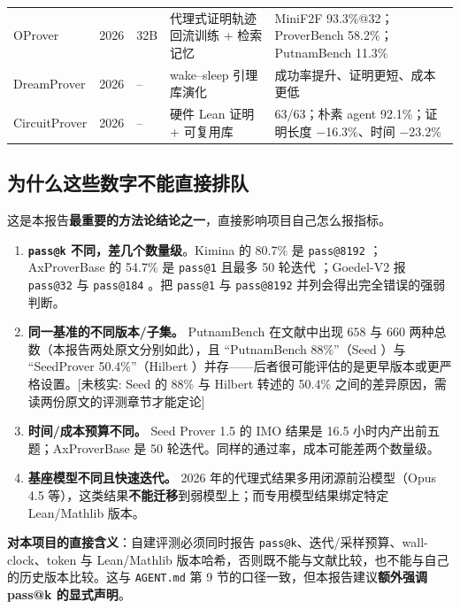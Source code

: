 \documentclass[UTF8,a4paper,11pt,fontset=windows]{ctexart}
\newcommand{\code}[1]{\texttt{#1}}
\newcommand{\unverified}[1]{\textcolor{warnred}{[未核实: #1]}}
\newcommand{\brk}{\penalty0\relax}
\begin{document}
{\begin{longtable}{@{}L{2.6cm}L{0.9cm}L{2.4cm}L{4.0cm}L{5.3cm}@{}}
OProver & 2026 & 32B & 代理式证明轨迹回流训练 + 检索记忆 & MiniF2F 93.3\%@32；\brk{}ProverBench 58.2\%；\brk{}PutnamBench 11.3\% \cite{oprover} \\
DreamProver & 2026 & -- & wake--sleep 引理库演化 & 成功率提升、证明更短、成本更低 \cite{dreamprover} \\
CircuitProver & 2026 & -- & 硬件 Lean 证明 + 可复用库 & 63/63；朴素 agent 92.1\%；证明长度 $-$16.3\%、时间 $-$23.2\% \cite{circuitprover} \\
\end{longtable}
}

\subsection{为什么这些数字不能直接排队}\label{sec:incomparable}

这是本报告\textbf{最重要的方法论结论之一}，直接影响项目自己怎么报指标。

\begin{enumerate}
  \item \textbf{\code{pass@k} 不同，差几个数量级}。Kimina 的 80.7\% 是 \code{pass@8192} \cite{kimina}；AxProverBase 的 54.7\% 是 \code{pass@1} 且最多 50 轮迭代 \cite{axprover}；Goedel-V2 报 \code{pass@32} 与 \code{pass@184} \cite{goedelv2}。把 \code{pass@1} 与 \code{pass@8192} 并列会得出完全错误的强弱判断。
  \item \textbf{同一基准的不同版本/子集。} PutnamBench 在文献中出现 $658$ 与 $660$ 两种总数（本报告两处原文分别如此），且 ``PutnamBench 88\%''（Seed \cite{seedprover}）与 ``SeedProver 50.4\%''（Hilbert \cite{hilbert}）并存——后者很可能评估的是更早版本或更严格设置。\unverified{Seed 的 88\% 与 Hilbert 转述的 50.4\% 之间的差异原因，需读两份原文的评测章节才能定论}
  \item \textbf{时间/成本预算不同。} Seed Prover 1.5 的 IMO 结果是 16.5 小时内产出前五题；AxProverBase 是 50 轮迭代。同样的通过率，成本可能差两个数量级。
  \item \textbf{基座模型不同且快速迭代。} 2026 年的代理式结果多用闭源前沿模型（Opus 4.5 等），这类结果\textbf{不能迁移}到弱模型上；而专用模型结果绑定特定 Lean/Mathlib 版本。
\end{enumerate}

\textbf{对本项目的直接含义}：自建评测必须同时报告 \code{pass@k}、迭代/采样预算、wall-clock、token 与 Lean/Mathlib 版本哈希，否则既不能与文献比较，也不能与自己的历史版本比较。这与 \code{AGENT.md} 第 9 节的口径一致，但本报告建议\textbf{额外强调 pass@k 的显式声明}。
\end{document}
